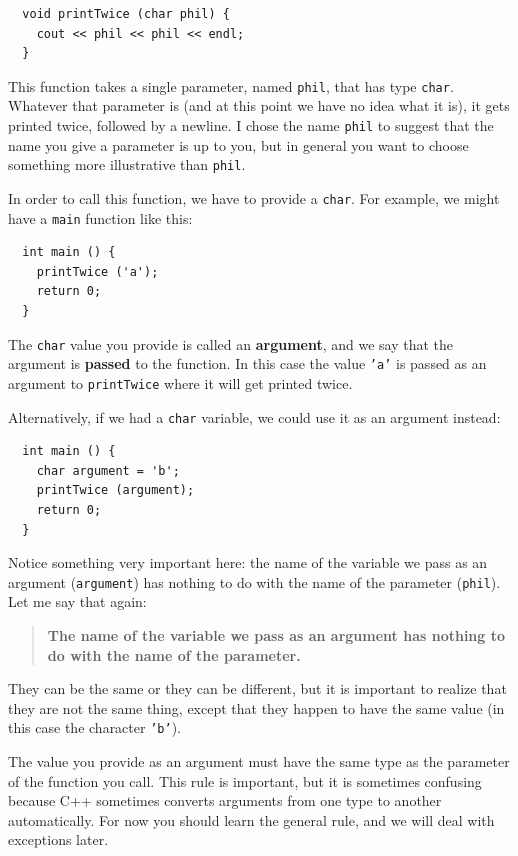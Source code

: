 \begin{verbatim}
  void printTwice (char phil) {
    cout << phil << phil << endl;
  }
\end{verbatim}
%
This function takes a single parameter, named {\tt phil}, that
has type {\tt char}.  Whatever that parameter is (and at
this point we have no idea what it is), it gets printed
twice, followed by a newline.
I chose the name {\tt phil} to suggest that the name
you give a parameter is up to you, but in general you want to
choose something more illustrative than {\tt phil}.

In order to call this function, we have to provide a {\tt char}.
For example, we might have a {\tt main} function like this:

\begin{verbatim}
  int main () {
    printTwice ('a');
    return 0;
  }
\end{verbatim}
%
The {\tt char} value you provide is called an {\bf argument}, and we
say that the argument is {\bf passed} to the function.  In this
case the value {\tt 'a'} is passed as an argument
to {\tt printTwice} where it will get printed twice.

Alternatively, if we had a {\tt char} variable, we could
use it as an argument instead:

\begin{verbatim}
  int main () {
    char argument = 'b';
    printTwice (argument);
    return 0;
  }
\end{verbatim}
%
Notice something very important here: the name of the variable we pass
as an argument ({\tt argument}) has nothing to do with the name of the
parameter ({\tt phil}).  Let me say that again:

\begin{quote}

{\bf The name of the variable we pass as an argument has nothing to do
with the name of the parameter.}

\end{quote}

They can be the same or they can be different, but it is important
to realize that they are not the same thing, except that they happen
to have the same value (in this case the character {\tt 'b'}).

The value you provide as an argument must have the same type as
the parameter of the function you call.  This rule is
important, but it is sometimes confusing because C++ sometimes
converts arguments from one type to another automatically.  For
now you should learn the general rule, and we will deal with
exceptions later.

